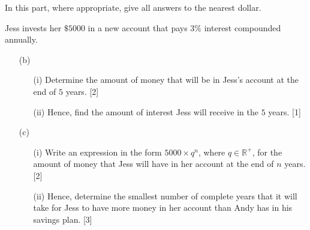 \documentclass[12pt, twoside]{article}
\begin{document}
\begin{enumerate}[itemsep=0.35cm]
In this part, where appropriate, give all answers to the nearest dollar.

Jess invests her $\$5000$ in a new account that pays $3\%$ interest
compounded annually.

\begin{enumerate}[itemsep=0.18cm]
  \item[(b)] \begin{enumerate}[itemsep=0.12cm]
    \item[(i)] Determine the amount of money that will be in Jess's
    account at the end of $5$ years. \hfill [2]
    \item[(ii)] Hence, find the amount of interest Jess will receive in
    the $5$ years. \hfill [1]
  \end{enumerate}
  \item[(c)] \begin{enumerate}[itemsep=0.12cm]
    \item[(i)] Write an expression in the form $5000\times q^n$, where
    $q\in\mathbb{R}^+$, for the amount of money that Jess will have in
    her account at the end of $n$ years. \hfill [2]
    \item[(ii)] Hence, determine the smallest number of complete years
    that it will take for Jess to have more money in her account than
    Andy has in his savings plan. \hfill [3]
  \end{enumerate}
\end{enumerate}

\end{enumerate}
\end{document}
